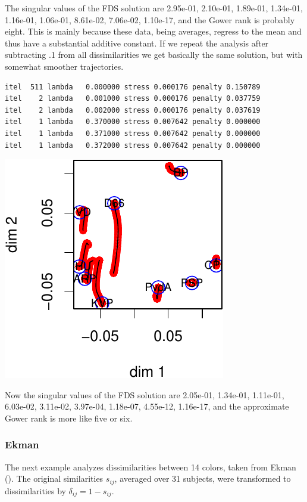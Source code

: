 \documentclass[
  12pt,
  letterpaper,
  DIV=11,
  numbers=noendperiod]{scrreprt}
\theoremstyle{remark}
\begin{document}
The singular values of the FDS solution are 2.95e-01, 2.10e-01,
1.89e-01, 1.34e-01, 1.16e-01, 1.06e-01, 8.61e-02, 7.06e-02, 1.10e-17,
and the Gower rank is probably eight. This is mainly because these data,
being averages, regress to the mean and thus have a substantial additive
constant. If we repeat the analysis after subtracting .1 from all
dissimilarities we get basically the same solution, but with somewhat
smoother trajectories.

\begin{verbatim}
itel  511 lambda   0.000000 stress 0.000176 penalty 0.150789 
itel    2 lambda   0.001000 stress 0.000176 penalty 0.037759 
itel    2 lambda   0.002000 stress 0.000176 penalty 0.037619 
itel    1 lambda   0.370000 stress 0.007642 penalty 0.000000 
itel    1 lambda   0.371000 stress 0.007642 penalty 0.000000 
itel    1 lambda   0.372000 stress 0.007642 penalty 0.000000 
\end{verbatim}

\begin{center}
\includegraphics{global_files/figure-pdf/poldist3-1.pdf}
\end{center}

Now the singular values of the FDS solution are 2.05e-01, 1.34e-01,
1.11e-01, 6.03e-02, 3.11e-02, 3.97e-04, 1.18e-07, 4.55e-12, 1.16e-17,
and the approximate Gower rank is more like five or six.

\subsubsection{Ekman}\label{ekman-1}

The next example analyzes dissimilarities between 14 colors, taken from
Ekman (). The original similarities
\(s_{ij}\), averaged over 31 subjects, were transformed to
dissimilarities by \(\delta_{ij}=1-s_{ij}\).
\end{document}

